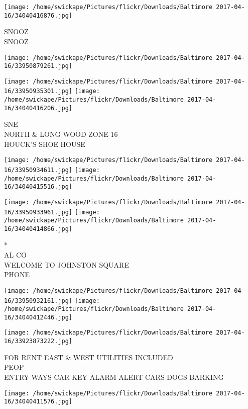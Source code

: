 \documentclass[10pt,letterpaper]{article}
\begin{document}
\vspace{0.25in}
\texttt{[image: /home/swickape/Pictures/flickr/Downloads/Baltimore 2017-04-16/34040416876.jpg]}

SNOOZ\\
SNOOZ\\
\pagebreak

\texttt{[image: /home/swickape/Pictures/flickr/Downloads/Baltimore 2017-04-16/33950879261.jpg]}

\vspace{0.25in}
\texttt{[image: /home/swickape/Pictures/flickr/Downloads/Baltimore 2017-04-16/33950935301.jpg]}
\texttt{[image: /home/swickape/Pictures/flickr/Downloads/Baltimore 2017-04-16/34040416206.jpg]}

SNE\\
NORTH \& LONG WOOD ZONE 16\\
HOUCK'S SHOE HOUSE\\
\pagebreak

\texttt{[image: /home/swickape/Pictures/flickr/Downloads/Baltimore 2017-04-16/33950934611.jpg]}
\texttt{[image: /home/swickape/Pictures/flickr/Downloads/Baltimore 2017-04-16/34040415516.jpg]}

\texttt{[image: /home/swickape/Pictures/flickr/Downloads/Baltimore 2017-04-16/33950933961.jpg]}
\texttt{[image: /home/swickape/Pictures/flickr/Downloads/Baltimore 2017-04-16/34040414866.jpg]}

*\\
AL CO\\
WELCOME TO JOHNSTON SQUARE\\
PHONE\\
\pagebreak

\texttt{[image: /home/swickape/Pictures/flickr/Downloads/Baltimore 2017-04-16/33950932161.jpg]}
\texttt{[image: /home/swickape/Pictures/flickr/Downloads/Baltimore 2017-04-16/34040412446.jpg]}

\texttt{[image: /home/swickape/Pictures/flickr/Downloads/Baltimore 2017-04-16/33923873222.jpg]}

FOR RENT EAST \& WEST UTILITIES INCLUDED\\
PEOP\\
ENTRY WAYS CAR KEY ALARM ALERT CARS DOGS BARKING\\
\pagebreak

\texttt{[image: /home/swickape/Pictures/flickr/Downloads/Baltimore 2017-04-16/34040411576.jpg]}
\end{document}
